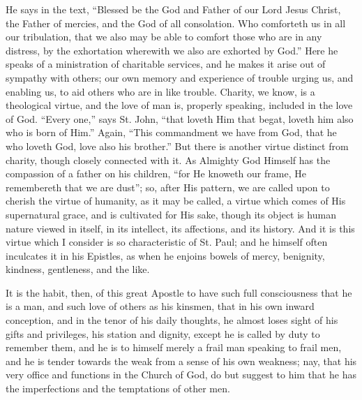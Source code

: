 He says in the text, ``Blessed be the God and
Father of our Lord Jesus Christ, the Father of mercies,
and the God of all consolation. Who comforteth us in all
our tribulation, that we also may be able to comfort
those who are in any distress, by the exhortation
wherewith we also are exhorted by God.'' Here he
speaks of a ministration of charitable services, and he
makes it arise out of sympathy with others; our own
memory and experience of trouble urging us, and enabling
us, to aid others who are in like trouble. Charity, we
know, is a theological virtue, and the love of man is,
properly speaking, included in the love of God.
``Every one,'' says St. John, ``that loveth
Him that begat, loveth him also who is born of Him.''
Again, ``This commandment we have from God, that he
who loveth God, love also his brother.'' But there is
another virtue distinct from charity, though closely
connected with it. As Almighty God Himself has the
compassion of a father on his children, ``for He
knoweth our frame, He remembereth that we are dust'';
so, after His pattern, we are called upon to cherish the
virtue of humanity, as it may be called, a virtue which
comes of His supernatural grace, and is cultivated for
His sake, though its object is human nature viewed in itself, in its intellect, its
affections, and its
history. And it is this virtue which I consider is so
characteristic of St. Paul; and he himself often
inculcates it in his Epistles, as when he enjoins bowels
of mercy, benignity, kindness, gentleness, and the like.

It is the habit, then, of this great Apostle to have
such full consciousness that he is a man, and such love
of others as his kinsmen, that in his own inward
conception, and in the tenor of his daily thoughts, he
almost loses sight of his gifts and privileges, his
station and dignity, except he is called by duty to
remember them, and he is to himself merely a frail man
speaking to frail men, and he is tender towards the weak
from a sense of his own weakness; nay, that his very
office and functions in the Church of God, do but suggest
to him that he has the imperfections and the temptations
of other men.

